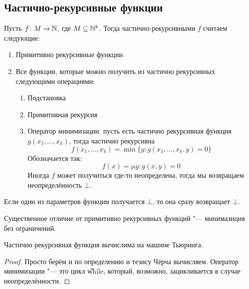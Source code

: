 \subsection{Частично-рекурсивные функции}
\begin{Def}
	Пусть $f \colon M \to \mathbb{N}$, где $M \subseteq \mathbb{N}^k$.
	Тогда частично-рекурсивными $f$ считаем следующие:
	\begin{enumerate}
	\item Примитивно рекурсивные функции
	\item Все функции, которые можно получить из частично рекурсивных следующими операциями:
		\begin{enumerate}
		\item Подстановка
		\item Примитивная рекурсия
		\item Оператор минимизации: пусть есть частично рекурсивная функция $g(x_1, \dots, x_k)$,
			тогда частично рекурсивна
			\[ f(x_1, \dots, x_k) = \min \{ y \colon g(x_1, \dots, x_k, y) = 0 \} \]
			Обозначается так:
			\[ f(x) = \mu y \colon g(x, y) = 0 \]
			Иногда $f$ может получиться где-то неопределена, тогда мы возвращаем неопределённость $\bot$.
		\end{enumerate}
	\end{enumerate}
	Если один из параметров функции получается $\bot$, то она сразу возвращает $\bot$.
\end{Def}
\begin{Rem}
	Существенное отличие от примитивно рекурсивных функций "--- минимазиция без ограничений.
\end{Rem}
\begin{theorem}
	Частично рекурсивная функция вычислима на машине Тьюринга.
\end{theorem}
\begin{proof}
	Просто берём и по определению и тезису Чёрча вычисляем.
	Оператор минимизации "--- это цикл \t{while}, который, возможно, зацикливается в случае неопределённости.
\end{proof}

